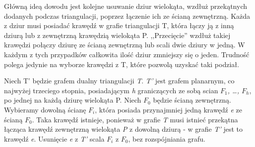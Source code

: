 \documentclass[brudnopis]{xmgr}
\newtheorem{Definicja}{Definicja}
\begin{document}
\indent Główną ideą dowodu jest kolejne usuwanie dziur wielokąta, wzdłuż przekątnych dodanych podczas triangulacji, poprzez łączenie ich ze ścianą zewnętrzną. Każda z dziur musi posiadać krawędź w grafie triangulacji T, która łączy ją z inną dziurą lub z zewnętrzną krawędzią wielokąta P. ,,Przecięcie'' wzdłuż takiej krawędzi połączy dziurę ze ścianą zewnętrzną lub scali dwie dziury w jedną. W każdym z tych przypadków całkowita ilość dziur zmniejszy się o jeden. Trudność polega jedynie na wyborze krawędzi z T, które pozwolą uzyskać taki podział.

\indent Niech T' będzie grafem dualny triangulacji \textit{T}. \textit{T'} jest grafem planarnym, co najwyżej trzeciego stopnia, posiadającym \textit{h} graniczących ze sobą scian \textit{$F_1$, \ldots, $F_h$}, po jednej na każdą dziurę wielokąta P. Niech $F_0$ będzie ścianą zewnętrzną. Wybieramy dowolną ścianę $F_i$, która posiada przynajmniej jedną krawędź \textit{e} ze ścianą $F_0$. Taka krawędź istnieje, ponieważ w grafie \textit{T} musi istnieć przekątna łącząca krawędź zewnętrzną wielokąta \textit{P} z dowolną dziurą - w grafie \textit{T'} jest to krawędź \textit{e}. Usunięcie \textit{e} z \textit{T'} scala \textit{$F_i$} z $F_0$, bez rozspójniania grafu.


\end{document}
